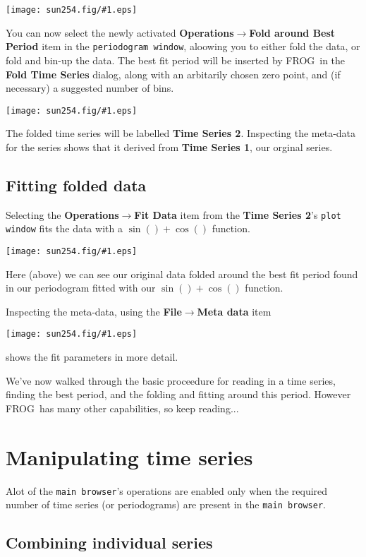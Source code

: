 \documentclass[twoside,11pt]{article}
\newcommand{\htmladdimg}[1]{}
\newcommand{\latexhtml}[2]{#1}
\newcommand{\xlabel}[1]{}
\renewcommand{\_}{\texttt{\symbol{95}}}
\newcommand{\FROG}{\textsf{FROG}}
\newcommand{\mainfigure}[1]
{\begin{center}
 \latexhtml{\texttt{[image: sun254.fig/\#1.eps]}}{\htmladdimg{../sun254.fig/#1.gif}}
 \end{center}
}
\newcommand{\submenuitem}[2]{\latexhtml{\textbf{#1$\rightarrow$#2}}{\textbf{#1=>#2}}}
\newcommand{\labelitem}[1]{\textbf{#1}}
\newcommand{\hitext}[1]{\texttt{#1}}
\begin{document}
\mainfigure{fft_marked}

You can now select the newly activated \submenuitem{Operations}{Fold around Best Period} item in the \hitext{periodogram window}, aloowing you to either fold the data, or fold and bin-up the data. The best fit period will be inserted by \FROG\ in the \labelitem{Fold Time Series} dialog, along with an arbitarily chosen zero point, and (if necessary) a suggested number of bins.

\mainfigure{fold}

The folded time series will be labelled \labelitem{Time Series 2}. Inspecting the meta-data for the series shows that it derived from \labelitem{Time Series 1}, our orginal series.

\subsection{Fitting folded data\xlabel{fitting_folded_data}\label{fitting_folded_data}}

Selecting the \submenuitem{Operations}{Fit Data} item from the \labelitem{Time Series 2}'s \hitext{plot window} fits the data with a $\sin()+\cos()$ function.

\mainfigure{fold_and_fit}

Here (above) we can see our original data folded around the best fit period found in our periodogram fitted with our $\sin()+\cos()$ function.

Inspecting the meta-data, using the \submenuitem{File}{Meta data} item

\mainfigure{meta_data2}

shows the fit parameters in more detail.

We've now walked through the basic proceedure for reading in a time series, finding the best period, and the folding and fitting around this period. However \FROG\ has many other capabilities, so keep reading...

\section{Manipulating time series\xlabel{manipulating_time_series}}

Alot of the \hitext{main browser}'s operations are enabled only when the required number of time series (or periodograms) are present in the \hitext{main browser}.

\subsection{Combining individual series\xlabel{combing_time_series}}
\end{document}
